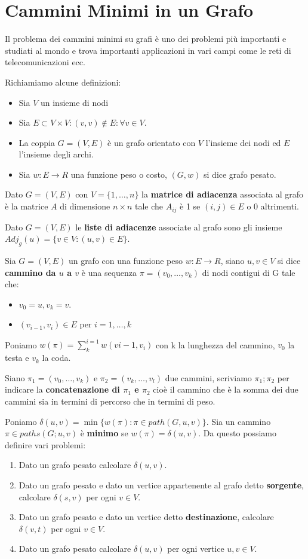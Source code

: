 \chapter{Cammini Minimi in un Grafo}
Il problema dei cammini minimi su grafi è uno dei problemi più importanti e studiati al mondo e trova importanti applicazioni in vari campi come le reti di telecomunicazioni ecc.

Richiamiamo alcune definizioni:
\begin{itemize}
    \item Sia $V$ un insieme di nodi
    \item Sia $E \subset V \times V: (v,v) \notin E:\forall v \in V$.
    \item La coppia $G=(V,E)$ è un grafo orientato con $V$ l'insieme dei nodi ed $E$ l'insieme degli archi. 
    \item Sia $w:E\rightarrow R$ una funzione peso o costo, $(G,w)$ si dice grafo pesato.
\end{itemize}

Dato $G=(V,E)$ con $V=\{1,\dots,n\}$ la \textbf{matrice di adiacenza} associata al grafo è la matrice $A$ di dimensione $n \times n$ tale che $A_{ij}$ è 1 se $(i,j)\in E$ o 0 altrimenti. 

Dato $G=(V,E)$ le \textbf{liste di adiacenze} associate al grafo sono gli insieme $Adj_g(u) = \{v \in V: (u,v)\in E\}$.

Sia $G=(V,E)$  un grafo con una funzione peso $w:E \rightarrow R$, siano $u,v \in V$ si dice \textbf{cammino da $u$ a $v$} è una sequenza $\pi = (v_0, \dots, v_k)$ di nodi contigui di G tale che:
\begin{itemize}
    \item $v_0 = u, v_k = v$.
    \item $(v_{i-1},v_i)\in E$ per $i=1, \dots, k$
\end{itemize} 
Poniamo $w(\pi) = \sum_{k}^{i=1}w(v{i-1},v_i)$  con k la lunghezza del cammino, $v_0$ la testa e $v_k$ la coda.

Siano $\pi_1 = (v_0, \dots, v_k)$ e $\pi_2 = (v_k, \dots, v_l)$ due cammini, scriviamo $\pi_1;\pi_2$ per indicare la \textbf{concatenazione di $\pi_1$ e $\pi_2$} cioè il cammino che è la somma dei due cammini sia in termini di percorso che in termini di peso. 

Poniamo $\delta(u,v)= \min\{w(\pi): \pi \in path(G,u,v)\}$. Sia un cammino $\pi \in paths(G;u,v)$ è \textbf{minimo} se $w(\pi) = \delta(u,v)$. 
Da questo possiamo definire vari problemi:
\begin{enumerate}
    \item Dato un grafo pesato calcolare $\delta(u,v)$.
    \item Dato un grafo pesato e dato un vertice appartenente al grafo detto \textbf{sorgente}, calcolare $\delta(s,v)$ per ogni $v \in V$.
    \item Dato un grafo pesato e dato un vertice detto \textbf{destinazione}, calcolare $\delta(v,t)$ per ogni $v \in V$.
    \item Dato un grafo pesato calcolare $\delta(u,v)$ per ogni vertice $u,v \in V$. 
\end{enumerate}

